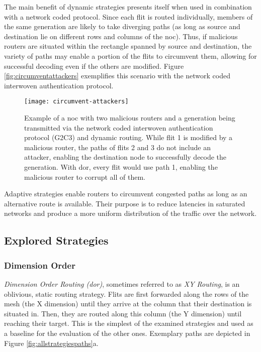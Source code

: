 The main benefit of dynamic strategies presents itself when used in combination with a network coded protocol. Since each flit is routed individually,
members of the same generation are likely to take diverging paths (as long as source and destination lie on different rows and columns of the
\gls{noc}). Thus, if malicious routers are situated within the rectangle spanned by source and destination, the variety of paths may enable a portion
of the flits to circumvent them, allowing for successful decoding even if the others are modified. Figure \vref{fig:circumventattackers} exemplifies
this scenario with the network coded interwoven authentication protocol.

\begin{figure}
    \centering
    \texttt{[image: circumvent-attackers]}
    \caption[Example of dodging malicious routers with dynamic routing]{Example of a \gls{noc} with two malicious routers and a generation being
    transmitted via the network coded interwoven authentication protocol (G2C3) and dynamic routing. While flit 1 is modified by a malicious router,
    the paths of flits 2 and 3 do not include an attacker, enabling the destination node to successfully decode the generation. With \gls{dor}, every
    flit would use path 1, enabling the malicious router to corrupt all of them.}
    \label{fig:circumventattackers}
\end{figure}

Adaptive strategies enable routers to circumvent congested paths as long as an alternative route is available. Their purpose is to reduce latencies in
saturated networks and produce a more uniform distribution of the traffic over the network.

\subsection{Explored Strategies}\label{subsec:routingstrategies}
\subsubsection{Dimension Order}\label{subsubsec:dor}
\textit{Dimension Order Routing (\gls{dor})}, sometimes referred to as \textit{XY Routing}, is an oblivious, static routing strategy. Flits are first
forwarded along the rows of the mesh (the X dimension) until they arrive at the column that their destination is situated in. Then, they are routed
along this column (the Y dimension) until reaching their target. This is the simplest of the examined strategies and used as a baseline for the
evaluation of the other ones. Exemplary paths are depicted in Figure \ref{fig:allstrategiespaths}a.

